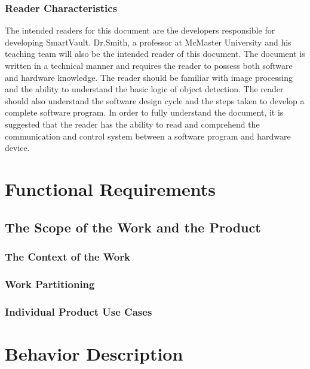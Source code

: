 \documentclass[12pt]{article}
\begin{document}
\subsubsection{Reader Characteristics}
The intended readers for this document are the developers responsible for developing SmartVault. Dr.Smith, a professor at McMaster University and his teaching team will also be the intended reader of this document. The document is written in a technical manner and requires the reader to possess both software and hardware knowledge. The reader should be familiar with image processing and the ability to understand the basic logic of object detection. The reader should also understand the software design cycle and the steps taken to develop a complete software program. In order to fully understand the document, it is suggested that the reader has the ability to read and comprehend the communication and control system between a software program and hardware device. 
\section{Functional Requirements}


\subsection{The Scope of the Work and the Product}

\subsubsection{The Context of the Work}

\subsubsection{Work Partitioning}

\subsubsection{Individual Product Use Cases}

\section{Behavior Description}
\end{document}
